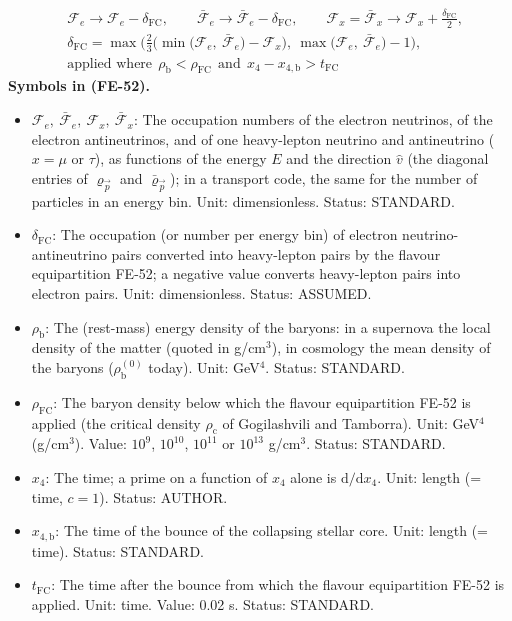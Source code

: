 \documentclass[
  10pt,
]{article}
\providecommand{\tightlist}{%
  \setlength{\itemsep}{0pt}\setlength{\parskip}{0pt}}
\begin{document}
\[
\begin{aligned}
&\mathcal{F}_{e} \to \mathcal{F}_{e} - \delta_{\mathrm{FC}},\qquad \bar{\mathcal{F}}_{e} \to \bar{\mathcal{F}}_{e} - \delta_{\mathrm{FC}},\qquad
 \mathcal{F}_{x} = \bar{\mathcal{F}}_{x} \to \mathcal{F}_{x} + \frac{\delta_{\mathrm{FC}}}{2},\\
&\delta_{\mathrm{FC}} = \max\Big(\frac23\Big(\min\big(\mathcal{F}_{e},\ \bar{\mathcal{F}}_{e}\big) - \mathcal{F}_{x}\Big),\ \max\big(\mathcal{F}_{e},\ \bar{\mathcal{F}}_{e}\big) - 1\Big),\\
&\text{applied where}\ \ \rho_{\mathrm{b}} < \rho_{\mathrm{FC}}\ \ \text{and}\ \ x_4 - x_{4,\mathrm{b}} > t_{\mathrm{FC}}
\end{aligned} \tag{FE-52}
\] \textbf{Symbols in (FE-52).}

\begin{itemize}
\tightlist
\item
  \(\mathcal{F}_{e},\ \bar{\mathcal{F}}_{e},\ \mathcal{F}_{x},\ \bar{\mathcal{F}}_{x}\):
  The occupation numbers of the electron neutrinos, of the electron
  antineutrinos, and of one heavy-lepton neutrino and antineutrino
  (\(x = \mu\) or \(\tau\)), as functions of the energy \(E\) and the
  direction \(\hat v\) (the diagonal entries of \(\varrho_{\vec p}\) and
  \(\bar\varrho_{\vec p}\)); in a transport code, the same for the
  number of particles in an energy bin. Unit: dimensionless. Status:
  STANDARD.
\item
  \(\delta_{\mathrm{FC}}\): The occupation (or number per energy bin) of
  electron neutrino-antineutrino pairs converted into heavy-lepton pairs
  by the flavour equipartition FE-52; a negative value converts
  heavy-lepton pairs into electron pairs. Unit: dimensionless. Status:
  ASSUMED.
\item
  \(\rho_{\mathrm{b}}\): The (rest-mass) energy density of the baryons:
  in a supernova the local density of the matter (quoted in g/cm\(^3\)),
  in cosmology the mean density of the baryons
  (\(\rho_{\mathrm{b}}^{(0)}\) today). Unit: GeV\(^4\). Status:
  STANDARD.
\item
  \(\rho_{\mathrm{FC}}\): The baryon density below which the flavour
  equipartition FE-52 is applied (the critical density
  \(\rho_{\mathrm{c}}\) of Gogilashvili and Tamborra). Unit: GeV\(^4\)
  (g/cm\(^3\)). Value: \(10^9\), \(10^{10}\), \(10^{11}\) or \(10^{13}\)
  g/cm\(^3\). Status: STANDARD.
\item
  \(x_4\): The time; a prime on a function of \(x_4\) alone is
  \(\mathrm{d}/\mathrm{d}x_4\). Unit: length (= time, \(c = 1\)).
  Status: AUTHOR.
\item
  \(x_{4,\mathrm{b}}\): The time of the bounce of the collapsing stellar
  core. Unit: length (= time). Status: STANDARD.
\item
  \(t_{\mathrm{FC}}\): The time after the bounce from which the flavour
  equipartition FE-52 is applied. Unit: time. Value: 0.02 s. Status:
  STANDARD.
\end{itemize}
\end{document}
